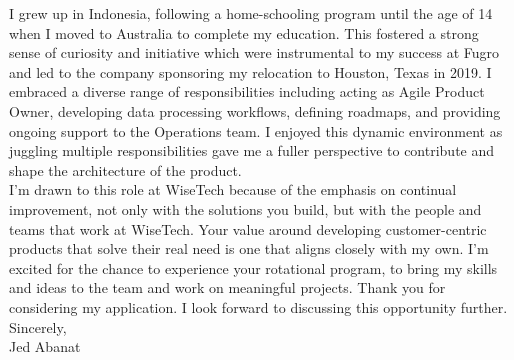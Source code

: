 I grew up in Indonesia, following a home-schooling program until the age of 14 when I moved to Australia to complete my education. This fostered a strong sense of curiosity and initiative which were instrumental to my success at Fugro and led to the company sponsoring my relocation to Houston, Texas in 2019. I embraced a diverse range of responsibilities including acting as Agile Product Owner, developing data processing workflows, defining roadmaps, and providing ongoing support to the Operations team. I enjoyed this dynamic environment as juggling multiple responsibilities gave me a fuller perspective to contribute and shape the architecture of the product. \\

I’m drawn to this role at WiseTech because of the emphasis on continual improvement, not only with the solutions you build, but with the people and teams that work at WiseTech. Your value around developing customer-centric products that solve their real need is one that aligns closely with my own. I'm excited for the chance to experience your rotational program, to bring my skills and ideas to the team and work on meaningful projects. Thank you for considering my application. I look forward to discussing this opportunity further. \\

Sincerely,\\
Jed Abanat